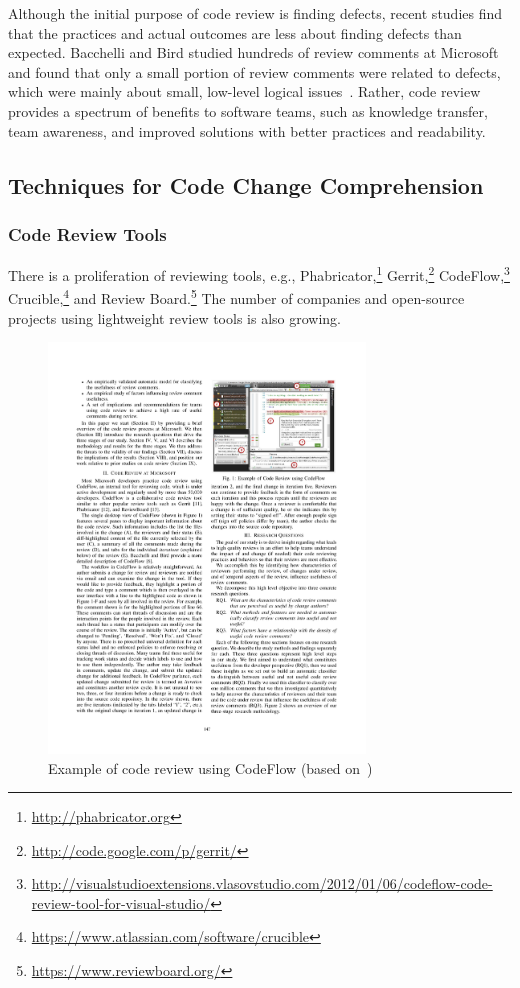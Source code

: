 \documentclass[runningheads,a4paper]{llncs}
\begin{document}
Although the initial purpose of code review is finding defects, recent studies find that the practices and actual outcomes are less about finding defects than expected. Bacchelli and Bird studied hundreds of review comments at Microsoft and found that only a small portion of review comments were related to defects, which were mainly about small, low-level logical issues~\cite{bacchelli2013expectations}. Rather, code review provides a spectrum of benefits to software teams, such as knowledge transfer, team awareness, and improved solutions with better practices and readability. 

\subsection{Techniques for Code Change Comprehension} 

\subsubsection{Code Review Tools} 
There is a proliferation of reviewing tools, e.g., Phabricator,\footnote{\url{http://phabricator.org}} Gerrit,\footnote{\url{http://code.google.com/p/gerrit/}} CodeFlow,\footnote{\url{http://visualstudioextensions.vlasovstudio.com/2012/01/06/codeflow-code-review-tool-for-visual-studio/}} Crucible,\footnote{\url{https://www.atlassian.com/software/crucible}} and Review Board.\footnote{\url{https://www.reviewboard.org/}} The number of companies and open-source projects using lightweight review tools is also growing.

\begin{figure}[ht]
 \centering
 \includegraphics[width=0.75\textwidth]{images/codeflow.pdf}
 \caption{Example of code review using CodeFlow (based on~\cite{bosu2015characteristics})}
 \label{fig:codeflow}
\end{figure}
\end{document}
